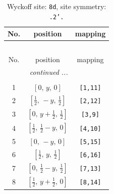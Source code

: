 \documentclass[fleqn,8pt]{jsarticle}
\begin{document}
\begin{longtable}{ccc}
\caption{Wyckoff site: {\tt 8d}, site symmetry: {\tt .2'.}}
 \\
 \hline \hline
No. & position & mapping \\ \hline \endfirsthead

\multicolumn{2}{l}{\tablename\ \thetable{}} \\
 \hline \hline
No. & position & mapping \\ \hline \endhead

 \hline \hline
\multicolumn{2}{r}{\footnotesize\it continued ...} \\ \endfoot

 \hline \hline
\multicolumn{2}{r}{} \\ \endlastfoot

1 & $\left[ 0,\, y,\, 0 \right]$ & {\tt [1,11]} \\ \hline
2 & $\left[ \frac{1}{2},\, - y,\, \frac{1}{2} \right]$ & {\tt [2,12]} \\ \hline
3 & $\left[ 0,\, y + \frac{1}{2},\, \frac{1}{2} \right]$ & {\tt [3,9]} \\ \hline
4 & $\left[ \frac{1}{2},\, \frac{1}{2} - y,\, 0 \right]$ & {\tt [4,10]} \\ \hline
5 & $\left[ 0,\, - y,\, 0 \right]$ & {\tt [5,15]} \\ \hline
6 & $\left[ \frac{1}{2},\, y,\, \frac{1}{2} \right]$ & {\tt [6,16]} \\ \hline
7 & $\left[ 0,\, \frac{1}{2} - y,\, \frac{1}{2} \right]$ & {\tt [7,13]} \\ \hline
8 & $\left[ \frac{1}{2},\, y + \frac{1}{2},\, 0 \right]$ & {\tt [8,14]} \\
\end{longtable}
\renewcommand{\arraystretch}{1.2}
\end{document}
